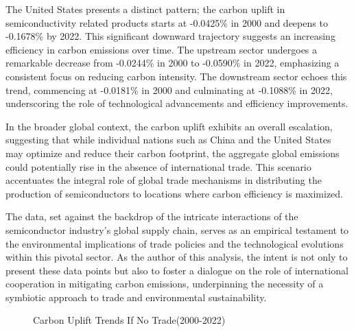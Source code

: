 The United States presents a distinct pattern; the carbon uplift in semiconductivity related products starts at -0.0425\% in 2000 and deepens to -0.1678\% by 2022. This significant downward trajectory suggests an increasing efficiency in carbon emissions over time. The upstream sector undergoes a remarkable decrease from -0.0244\% in 2000 to -0.0590\% in 2022, emphasizing a consistent focus on reducing carbon intensity. The downstream sector echoes this trend, commencing at -0.0181\% in 2000 and culminating at -0.1088\% in 2022, underscoring the role of technological advancements and efficiency improvements.

In the broader global context, the carbon uplift exhibits an overall escalation, suggesting that while individual nations such as China and the United States may optimize and reduce their carbon footprint, the aggregate global emissions could potentially rise in the absence of international trade. This scenario accentuates the integral role of global trade mechanisms in distributing the production of semiconductors to locations where carbon efficiency is maximized.

The data, set against the backdrop of the intricate interactions of the semiconductor industry's global supply chain, serves as an empirical testament to the environmental implications of trade policies and the technological evolutions within this pivotal sector. As the author of this analysis, the intent is not only to present these data points but also to foster a dialogue on the role of international cooperation in mitigating carbon emissions, underpinning the necessity of a symbiotic approach to trade and environmental sustainability.
\ifincludefigures
\begin{figure}
\centering
{}
\caption{Carbon Uplift Trends If No Trade(2000-2022)}\label{fig:Carbon Uplift Trends If No Trade(2000-2022)}
\end{figure}
\fi
